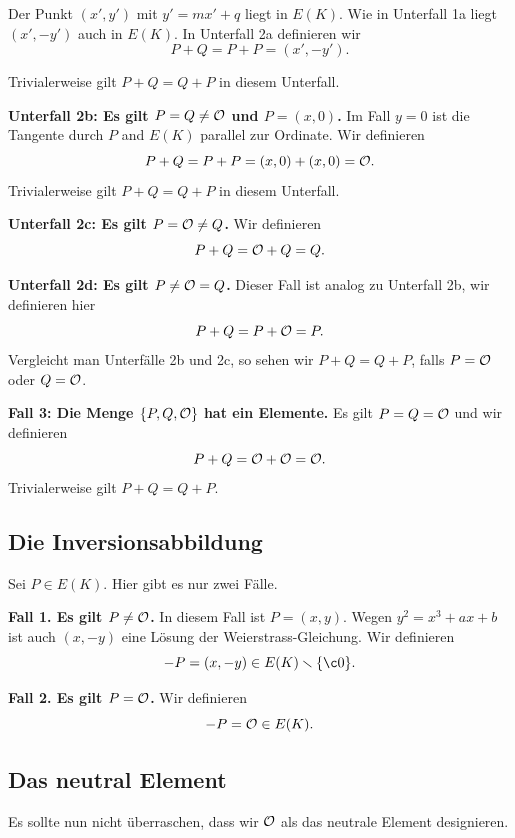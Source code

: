 Der Punkt $(x',y')$ mit $y'=mx'+q$ liegt in $E(K)$. Wie in Unterfall
1a liegt $(x',-y')$ auch in $E(K)$. 
In Unterfall 2a
definieren wir
\begin{equation*}
  P+Q = P+P = \left(x',-y'\right).
\end{equation*}

Trivialerweise gilt $P+Q=Q+P$ in diesem Unterfall.

\textbf{Unterfall 2b: Es gilt $P=Q\not={\mathcal O}$ und $P=(x,0)$.}
Im Fall $y=0$ ist die Tangente durch $P$ and $E(K)$ parallel zur
Ordinate. Wir 
definieren
\begin{equation*}
  P+Q = P+P = (x,0)+(x,0) = {\mathcal O}. 
\end{equation*}
Trivialerweise gilt $P+Q=Q+P$ in diesem Unterfall.

\textbf{Unterfall 2c: Es gilt $P={\mathcal O}\not=Q$.}
Wir definieren 
\begin{equation*}
  P+Q = {\mathcal O} + Q = Q. 
\end{equation*}


\textbf{Unterfall 2d: Es gilt $P\not={\mathcal O}=Q$.}
Dieser Fall ist analog zu Unterfall 2b, wir definieren hier
\begin{equation*}
  P+Q = P+{\mathcal O} = P. 
\end{equation*}
Vergleicht man Unterfälle 2b und 2c, so sehen wir $P+Q=Q+P$, falls
$P={\mathcal O}$ oder $Q={\mathcal O}$. 


\medskip
\textbf{Fall 3: Die Menge $\{P,Q,{\mathcal O}\}$ hat ein Elemente.} Es gilt
$P=Q={\mathcal O}$ und wir definieren
\begin{equation*}
  P+Q = {\mathcal O}+{\mathcal O} = {\mathcal O}. 
\end{equation*}
Trivialerweise gilt $P+Q=Q+P$. 

\subsection{Die Inversionsabbildung}

Sei $P\in E(K)$. Hier gibt es nur zwei Fälle.

\textbf{Fall 1. Es gilt $P\not={\mathcal O}$.} In diesem Fall ist $P=(x,y)$.
Wegen $y^2 = x^3+ax+b$ ist auch $(x,-y)$ eine Lösung der Weierstrass-Gleichung.
Wir  definieren
$$
-P = (x,-y)\in E(K)\ssm\{\c0\}.
$$

\textbf{Fall 2. Es gilt $P={\mathcal O}$.} 
Wir  definieren
$$
-P = {\mathcal O} \in E(K).
$$

\subsection{Das neutral Element}
Es sollte nun nicht überraschen, dass wir ${\mathcal O}$ als das neutrale
Element designieren.

